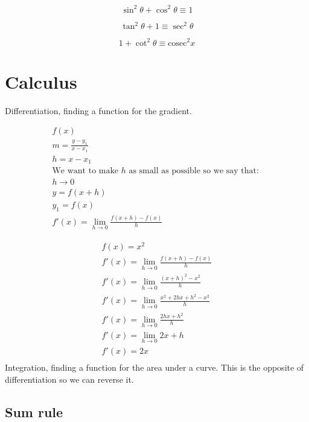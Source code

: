 \documentclass{article}
\begin{document}
\begin{equation}
	\sin^2 \theta  + \cos^2 \theta \equiv 1
\end{equation}

\begin{equation}
	\tan^2 \theta + 1 \equiv \sec^2 \theta
\end{equation}

\begin{equation}
	1 + \cot^2 \theta \equiv \mathrm{cosec}^2 x
\end{equation}

\section{Calculus}

Differentiation, finding a function for the gradient.

\begin{gather*}
	f(x)\\
	m = \frac{y - y_1}{x - x_1}\\
	h = x - x_1 \\
	\text{We want to make $h$ as small as possible so we say that: }\\
	h \to 0 \\
	y = f(x + h) \\
	y_1 = f(x) \\
	f'(x) = \lim_{h \to 0} \frac{f(x + h) - f(x)}{h}
\end{gather*}

\begin{gather*}
	f(x) = x^2 \\
	f'(x) = \lim_{h \to 0} \frac{f(x + h) - f(x)}{h} \\
	f'(x) = \lim_{h \to 0} \frac{(x + h)^2 - x^2}{h} \\
	f'(x) = \lim_{h \to 0} \frac{x^2 + 2hx + h^2 - x^2}{h} \\
	f'(x) = \lim_{h \to 0} \frac{2hx + h^2}{h} \\
	f'(x) = \lim_{h \to 0} 2x + h \\
	f'(x) = 2x \\
\end{gather*}
Integration, finding a function for the area under a curve.
This is the opposite of differentiation so we can reverse it.

\subsection{Sum rule}
\end{document}
